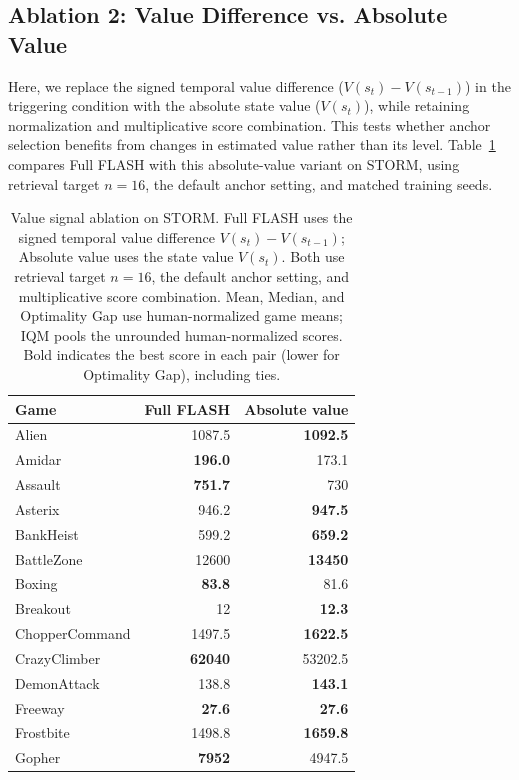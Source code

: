 \documentclass{article} %
\begin{document}
\subsection{Ablation 2: Value Difference vs. Absolute Value}
Here, we replace the signed temporal value difference ($V(s_t) - V(s_{t-1})$) in the triggering condition with the absolute state value ($V(s_t)$), while retaining normalization and multiplicative score combination. This tests whether anchor selection benefits from changes in estimated value rather than its level. Table~\ref{tab:value_signal_ablation} compares Full FLASH with this absolute-value variant on STORM, using retrieval target $n=16$, the default anchor setting, and matched training seeds.

\begin{table}[!htbp]
\centering
\small
\caption{Value signal ablation on STORM. Full FLASH uses the signed temporal value difference $V(s_t)-V(s_{t-1})$; Absolute value uses the state value $V(s_t)$. Both use retrieval target $n=16$, the default anchor setting, and multiplicative score combination. Mean, Median, and Optimality Gap use human-normalized game means; IQM pools the unrounded human-normalized scores. Bold indicates the best score in each pair (lower for Optimality Gap), including ties.}
\label{tab:value_signal_ablation}
\begin{tabular}{lrr}
\toprule
Game & Full FLASH & Absolute value \\
\midrule
Alien & 1087.5 & \textbf{1092.5} \\
Amidar & \textbf{196.0} & 173.1 \\
Assault & \textbf{751.7} & 730 \\
Asterix & 946.2 & \textbf{947.5} \\
BankHeist & 599.2 & \textbf{659.2} \\
BattleZone & 12600 & \textbf{13450} \\
Boxing & \textbf{83.8} & 81.6 \\
Breakout & 12 & \textbf{12.3} \\
ChopperCommand & 1497.5 & \textbf{1622.5} \\
CrazyClimber & \textbf{62040} & 53202.5 \\
DemonAttack & 138.8 & \textbf{143.1} \\
Freeway & \textbf{27.6} & \textbf{27.6} \\
Frostbite & 1498.8 & \textbf{1659.8} \\
Gopher & \textbf{7952} & 4947.5 \\

\end{tabular}
\end{table}
\end{document}
